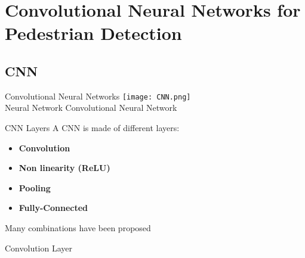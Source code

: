 \section{Convolutional Neural Networks for Pedestrian Detection}

\subsection{CNN}
\begin{frame}{Convolutional Neural Networks}
  \centering
\texttt{[image: CNN.png]}\\
\small
\vspace{1mm}
Neural Network \hspace{1.75cm} Convolutional Neural Network
\end{frame}

\begin{frame}{CNN Layers}
  A CNN is made of different layers:
  \begin{itemize}
    \item \textbf{Convolution}
    \item \textbf{Non linearity (ReLU)}
    \item \textbf{Pooling}
    \item \textbf{Fully-Connected}
  \end{itemize}
  Many combinations have been proposed
\end{frame}

\begin{frame}{Convolution Layer}
\end{frame}

